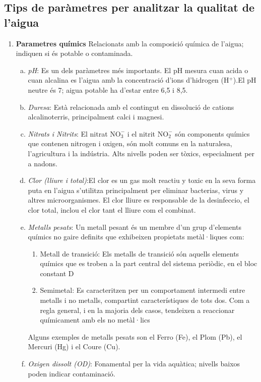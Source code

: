 \subsection{Tips de paràmetres per analitzar la qualitat de l'aigua}
\begin{enumerate}[1)]
 \item \textbf{Parametres químics}
 Relacionats amb la composició química de l’aigua; indiquen si és potable o contaminada.
 \begin{enumerate}[a)]
  \item \textit{pH}: Es un dels paràmetres més importants. El pH mesura cuan acida o cuan alcalina es l'aigua amb la concentració d’ions d’hidrogen (H$^+$).El pH neutre és 7; aigua potable ha d’estar entre 6,5 i 8,5.
  \item \textit{Duresa}: Està relacionada amb el contingut en dissolució de cations alcalinoterris, principalment calci i magnesi.
  \item \textit{Nitrats i Nitrits}: El nitrat \(\mathrm{NO_3^-}\) i el nitrit \(\mathrm{NO_2^-}\) són components químics que contenen nitrogen i oxigen, són molt comuns en la naturalesa, l’agricultura i la indústria. Alts nivells poden ser tòxics, especialment per a nadons.
  \item \textit{Clor (lliure i total)}:El clor es un gas molt reactiu y toxic en la seva forma puta en l'aigua s'utilitza principalment per eliminar bacterias, virus y altres microorganismes. El clor lliure es responsable de la desinfeccio, el clor total, inclou el clor tant el lliure com el combinat. \cite{WikiClor}
  \item \textit{Metalls pesats}: Un metall pesant és un membre d'un grup d'elements químics no gaire definits que exhibeixen propietats metàl·liques com:
   \begin{enumerate}
    \item Metall de transició: Els metalls de transició són aquells elements químics que es troben a la part central del sistema periòdic, en el bloc constant D
    \item Semimetal: Es caracteritzen per un comportament intermedi entre metalls i no metalls, compartint característiques de tots dos. Com a regla general, i en la majoria dels casos, tendeixen a reaccionar químicament amb els no metàl·lics
   \end{enumerate}
   Alguns exemples de metalls pesats son el Ferro (Fe), el Plom (Pb), el Mercuri (Hg) i el Coure (Cu). \cite{WikiMetales}
  \item \textit{Oxigen dissolt (OD)}: Fonamental per la vida aquàtica; nivells baixos poden indicar contaminació.
 \end{enumerate}


\end{enumerate}
